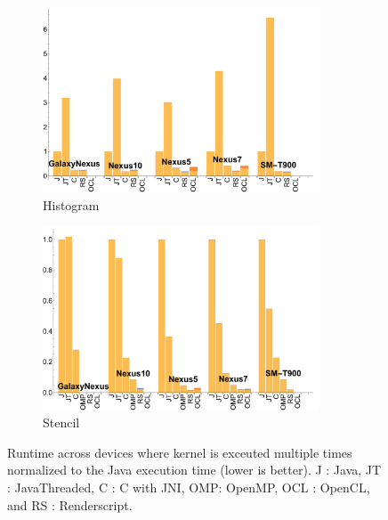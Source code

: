 \begin{figure}[t]
  \begin{subfigure}[b]{0.5\textwidth}
      \centering
      \includegraphics[width=0.9\textwidth]{data/Histogram_time.pdf}
      \caption{Histogram}\label{fig:histo}
  \end{subfigure}
  \begin{subfigure}[b]{0.5\textwidth}
      \centering
      \includegraphics[width=0.9\textwidth]{data/Stencil_time.pdf}
      \caption{Stencil}
      \label{fig:Stencil}
  \end{subfigure}

  \caption{Runtime across devices where kernel is exceuted multiple times normalized to the Java execution time (lower is better). J : Java, JT : JavaThreaded, C : C with JNI, OMP: OpenMP, OCL : OpenCL, and RS : Renderscript.}
\end{figure}
\FloatBarrier